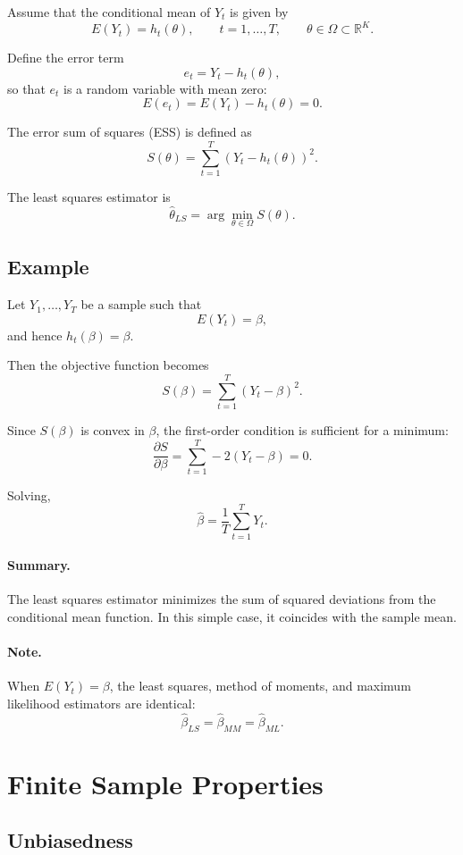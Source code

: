 Assume that the conditional mean of $Y_t$ is given by
\[
E(Y_t) = h_t(\theta),
\qquad t=1,\dots,T,
\qquad \theta \in \Omega \subset \mathbb{R}^K.
\]

Define the error term
\[
e_t = Y_t - h_t(\theta),
\]
so that $e_t$ is a random variable with mean zero:
\[
E(e_t) = E(Y_t) - h_t(\theta) = 0.
\]

The error sum of squares (ESS) is defined as
\[
S(\theta)
=
\sum_{t=1}^T (Y_t - h_t(\theta))^2.
\]

The least squares estimator is
\[
\hat{\theta}_{LS}
=
\arg\min_{\theta \in \Omega} S(\theta).
\]

\subsection{Example}

Let $Y_1,\dots,Y_T$ be a sample such that
\[
E(Y_t) = \beta,
\]
and hence $h_t(\beta)=\beta$.

Then the objective function becomes
\[
S(\beta)
=
\sum_{t=1}^T (Y_t - \beta)^2.
\]

Since $S(\beta)$ is convex in $\beta$, the first-order condition is sufficient for a minimum:
\[
\frac{\partial S}{\partial \beta}
=
\sum_{t=1}^T -2(Y_t - \beta)
=
0.
\]

Solving,
\[
\hat{\beta}
=
\frac{1}{T}\sum_{t=1}^T Y_t.
\]

\paragraph{Summary.}
The least squares estimator minimizes the sum of squared deviations from the conditional mean function.
In this simple case, it coincides with the sample mean.

\paragraph{Note.}
When $E(Y_t)=\beta$, the least squares, method of moments, and maximum likelihood estimators are identical:
\[
\hat{\beta}_{LS}
=
\hat{\beta}_{MM}
=
\hat{\beta}_{ML}.
\]

\section{Finite Sample Properties}

\subsection{Unbiasedness}

